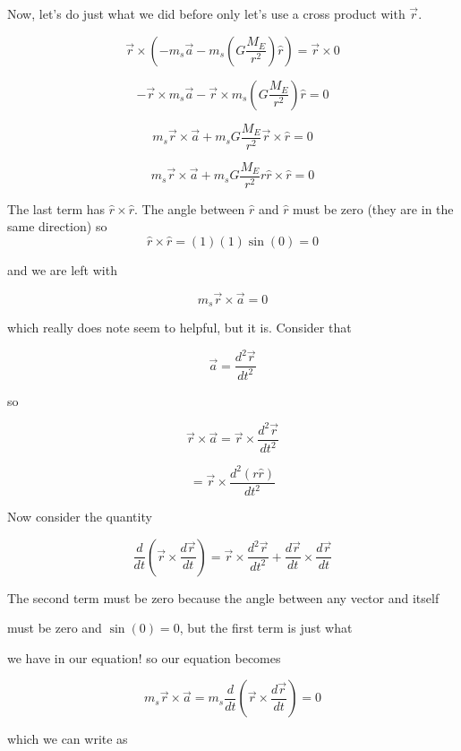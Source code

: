 Now, let's do just what we did before only let's use a cross product with 
$\overrightarrow{r}$. 

$$\overrightarrow{r}\times \left( -m_{s}\overrightarrow{a}-m_{s}\left( G\frac{M_{E}}{r^{2}}\right) \hat{r}\right) =\overrightarrow{r}\times 0
$$

$$-\overrightarrow{r}\times m_{s}\overrightarrow{a}-\overrightarrow{r}\times m_{s}\left( G\frac{M_{E}}{r^{2}}\right) \hat{r}=0
$$

$$m_{s}\overrightarrow{r}\times \overrightarrow{a}+m_{s}G\frac{M_{E}}{r^{2}}\overrightarrow{r}\times \hat{r}=0
$$

$$m_{s}\overrightarrow{r}\times \overrightarrow{a}+m_{s}G\frac{M_{E}}{r^{2}}r\hat{r}\times \hat{r}=0
$$

The last term has $\hat{r}\times \hat{r}.$ The angle between $\hat{r}$ and $\hat{r}$ must be zero (they are in the same direction) so 
$$\hat{r}\times \hat{r}=\left( 1\right) \left( 1\right) \sin \left( 0\right) =0$$

and we are left with 

$$m_{s}\overrightarrow{r}\times \overrightarrow{a}=0$$

which really does note seem to helpful, but it is. Consider that 

$$\overrightarrow{a}=\frac{d^{2}\overrightarrow{r}}{dt^{2}}$$

so 

$$\overrightarrow{r}\times \overrightarrow{a}=\overrightarrow{r}\times \frac{d^{2}\overrightarrow{r}}{dt^{2}}$$

$$=\overrightarrow{r}\times \frac{d^{2}\left( r\hat{r}\right) }{dt^{2}}$$


Now consider the quantity 

$$\frac{d}{dt}\left( \overrightarrow{r}\times \frac{d\overrightarrow{r}}{dt}\right)=\overrightarrow{r}\times\frac{d^{2}\overrightarrow{r}}{dt^{2}}+\frac{d\overrightarrow{r}}{dt}\times \frac{d\overrightarrow{r}}{dt}$$

The second term must be zero because the angle between any vector and itself

must be zero and $\sin \left( 0\right) =0$, but the first term is just what

we have in our equation! so our equation becomes%

$$m_{s}\overrightarrow{r}\times \overrightarrow{a}=m_{s}\frac{d}{dt}\left( \overrightarrow{r}\times \frac{d\overrightarrow{r}}{dt}\right) =0$$

which we can write as%

